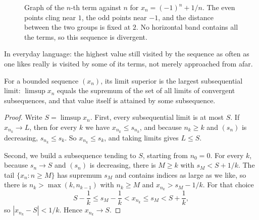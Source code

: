 \begin{figure}[htbp]
\centering
{}
\caption{Graph of the $n$-th term against $n$ for $x_n=(-1)^n+1/n$. The even points
cling near $1$, the odd points near $-1$, and the distance between the two groups is
fixed at $2$. No horizontal band contains all the terms, so this sequence is
divergent.}
\label{fig:divergen-ayun}
\end{figure}

In everyday language: the highest value still visited by the sequence as often as one
likes really is visited by some of its terms, not merely approached from afar.

\begin{teorema}
For a bounded sequence $(x_n)$, its limit superior is the largest subsequential limit:
$\limsup x_n$ equals the supremum of the set of all limits of convergent subsequences,
and that value itself is attained by some subsequence.
\end{teorema}

\begin{proof}
Write $S=\limsup x_n$. First, every subsequential limit is at most $S$. If
$x_{n_k} \to L$, then for every $k$ we have $x_{n_k} \le s_{n_k}$, and because
$n_k \ge k$ and $(s_n)$ is decreasing, $s_{n_k} \le s_k$. So $x_{n_k} \le s_k$, and
taking limits gives $L \le S$.

Second, we build a subsequence tending to $S$, starting from $n_0=0$. For every $k$,
because $s_n \to S$ and $(s_n)$ is decreasing, there is $M \ge k$ with $s_M<S+1/k$.
The tail $\{x_n : n \ge M\}$ has supremum $s_M$ and contains indices as large as we
like, so there is $n_k>\max(k,n_{k-1})$ with $n_k \ge M$ and $x_{n_k}>s_M-1/k$. For
that choice
\[
S - \frac1k \le s_M - \frac1k < x_{n_k} \le s_M < S + \frac1k ,
\]
so $|x_{n_k}-S|<1/k$. Hence $x_{n_k} \to S$.
\end{proof}

